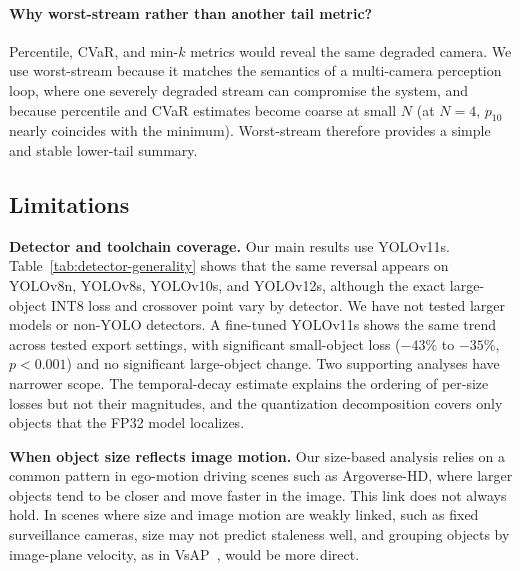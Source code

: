 \documentclass[runningheads]{llncs}
\begin{document}
\paragraph{\textbf{Why worst-stream rather than another tail metric?}}

Percentile, CVaR, and min-$k$ metrics would reveal the same degraded camera. We use worst-stream because it matches the semantics of a multi-camera perception loop, where one severely degraded stream can compromise the system, and because percentile and CVaR estimates become coarse at small $N$ (at $N{=}4$, $p_{10}$ nearly coincides with the minimum). Worst-stream therefore provides a simple and stable lower-tail summary.

\subsection{Limitations}
\label{sec:discussion:limitations}

\noindent\textbf{Detector and toolchain coverage.}
Our main results use YOLOv11s. Table~\ref{tab:detector-generality} shows that the same reversal appears on YOLOv8n, YOLOv8s, YOLOv10s, and YOLOv12s, although the exact large-object INT8 loss and crossover point vary by detector. We have not tested larger models or non-YOLO detectors. A fine-tuned YOLOv11s shows the same trend across tested export settings, with significant small-object loss ($-43\%$ to $-35\%$, $p<0.001$) and no significant large-object change. Two supporting analyses have narrower scope. The temporal-decay estimate explains the ordering of per-size losses but not their magnitudes, and the quantization decomposition covers only objects that the FP32 model localizes.

\noindent\textbf{When object size reflects image motion.}
Our size-based analysis relies on a common pattern in ego-motion driving scenes such as Argoverse-HD, where larger objects tend to be closer and move faster in the image. This link does not always hold. In scenes where size and image motion are weakly linked, such as fixed surveillance cameras, size may not predict staleness well, and grouping objects by image-plane velocity, as in VsAP~\cite{streamyolo-vsap}, would be more direct.
\end{document}
